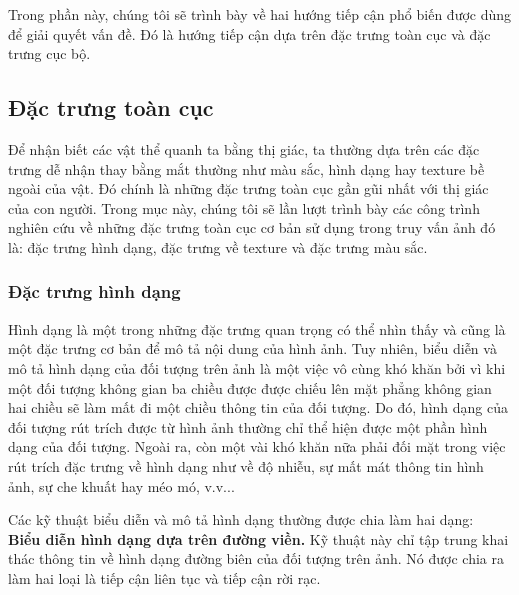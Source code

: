 Trong phần này, chúng tôi sẽ trình bày về hai hướng tiếp cận phổ biến được dùng để giải quyết vấn đề. Đó là hướng tiếp cận dựa trên đặc trưng toàn cục và đặc trưng cục bộ.

\subsection{Đặc trưng toàn cục}
Để nhận biết các vật thể quanh ta bằng thị giác, ta thường dựa trên các đặc trưng dễ nhận thay bằng mắt thường như màu sắc, hình dạng hay texture bề ngoài của vật. Đó chính là những đặc trưng toàn cục gần gũi nhất với thị giác của con người. Trong mục này, chúng tôi sẽ lần lượt trình bày các công trình nghiên cứu về những đặc trưng toàn cục cơ bản sử dụng trong truy vấn ảnh đó là: đặc trưng hình dạng, đặc trưng về texture và đặc trưng màu sắc.

\subsubsection{Đặc trưng hình dạng}
Hình dạng là một trong những đặc trưng quan trọng có thể nhìn thấy và cũng là một đặc trưng cơ bản để mô tả nội dung của hình ảnh. Tuy nhiên, biểu diễn và mô tả hình dạng của đối tượng trên ảnh là một việc vô cùng khó khăn bởi vì khi một đối tượng không gian ba chiều được được chiếu lên mặt phẳng không gian hai chiều sẽ làm mất đi một chiều thông tin của đối tượng. Do đó, hình dạng của đối tượng rút trích được từ hình ảnh thường chỉ thể hiện được một phần hình dạng của đối tượng. Ngoài ra, còn một vài khó khăn nữa phải đối mặt trong việc rút trích đặc trưng về hình dạng như về độ nhiễu, sự mất mát thông tin hình ảnh, sự che khuất hay méo mó, v.v...

Các kỹ thuật biểu diễn và mô tả hình dạng thường được chia làm hai dạng:\\
\textbf{Biểu diễn hình dạng dựa trên đường viền.} Kỹ thuật này chỉ tập trung khai thác thông tin về hình dạng đường biên của đối tượng trên ảnh. Nó được chia ra làm hai loại là tiếp cận liên tục và tiếp cận rời rạc. 

